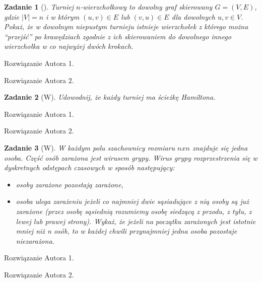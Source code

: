 \documentclass{mwart}
\newtheorem{zad}{Zadanie}[section]
\begin{document}
\begin{zad}[]
    Turniej $n$-wierzchołkowy to dowolny graf skierowany $G = (V, E)$, gdzie $|V| = n$
    i w którym $(u, v) \in E$ lub $(v, u) \in E$ dla dowolnych $u, v \in V$.
    Pokaż, że w dowolnym niepustym turnieju istnieje wierzchołek z którego można “przejść”
    po krawędziach zgodnie z ich skierowaniem do dowolnego innego wierzchołka w co
    najwyżej dwóch krokach.
\end{zad}
\begin{mdframed}
    Rozwiązanie Autora 1.
\end{mdframed}
\begin{mdframed}
    Rozwiązanie Autora 2.
\end{mdframed}

\begin{zad}[W]
    Udowodnij, że każdy turniej ma ścieżkę Hamiltona.
\end{zad}
\begin{mdframed}
    Rozwiązanie Autora 1.
\end{mdframed}
\begin{mdframed}
    Rozwiązanie Autora 2.
\end{mdframed}




\begin{zad}[W]
    W każdym polu szachownicy rozmiaru $n x n $ znajduje się jedna osoba.
    Część osób zarażona jest wirusem grypy. Wirus grypy rozprzestrzenia się w dyskretnych
    odstępach czasowych w sposób następujący:
    \begin{itemize}
        \item osoby zarażone pozostają zarażone,
        \item osoba ulega zarażeniu jeżeli co najmniej dwie sąsiadujące z nią osoby są już zarażone
              (przez osobę sąsiednią rozumiemy osobę siedzącą z przodu, z tyłu, z lewej lub prawej
              strony).
              Wykaż, że jeżeli na początku zarażonych jest istotnie mniej niż n osób, to w każdej chwili
              przynajmniej jedna osoba pozostaje niezarażona.
    \end{itemize}
\end{zad}
\begin{mdframed}
    Rozwiązanie Autora 1.
\end{mdframed}
\begin{mdframed}
    Rozwiązanie Autora 2.
\end{mdframed}
\end{document}

